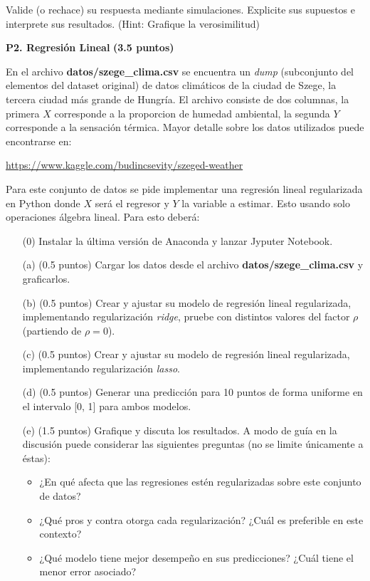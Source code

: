 \documentclass[11pt,letterpaper]{article}
\begin{document}
Valide (o rechace) su respuesta mediante simulaciones. Explicite sus supuestos e interprete sus resultados. (Hint: Grafique la verosimilitud)


\vspace{5 mm}
\noindent\textbf{P2. Regresión Lineal} \textbf{(3.5 puntos)}
\vspace{5 mm}

En el archivo \textbf{datos/szege\_clima.csv} se encuentra un \emph{dump} (subconjunto del  elementos del dataset original) de datos climáticos de la ciudad de Szege, la tercera ciudad más grande de Hungría. El archivo consiste de dos columnas, la primera $X$ corresponde a la proporcion de humedad ambiental, la segunda $Y$ corresponde a la sensación térmica. Mayor detalle sobre los datos utilizados puede encontrarse en:

\vspace{1em}
\centerline{\url{https://www.kaggle.com/budincsevity/szeged-weather}}
\vspace{1em}

Para este conjunto de datos se pide implementar una regresión lineal regularizada en Python donde $X$ será el regresor y $Y$ la variable a estimar. Esto usando solo operaciones álgebra lineal.
Para esto deberá:
\begin{itemize}
	\item[(0)] Instalar la última versión de Anaconda y lanzar Jyputer Notebook.
	\item[(a)] (0.5 puntos) Cargar los datos desde el archivo \textbf{datos/szege\_clima.csv} y graficarlos.
	\item[(b)] (0.5 puntos) Crear y ajustar su modelo de regresión lineal regularizada, implementando regularización \emph{ridge}, pruebe con distintos valores del factor $\rho$ (partiendo de $\rho=0$).
	\item[(c)] (0.5 puntos) Crear y ajustar su modelo de regresión lineal regularizada, implementando regularización \emph{lasso}.
	\item[(d)] (0.5 puntos) Generar una predicción para 10 puntos de forma uniforme en el intervalo [0, 1] para ambos modelos.
	\item[(e)] (1.5 puntos) Grafique y discuta los resultados. A modo de guía en la discusión puede considerar las siguientes preguntas (no se limite únicamente a éstas):
	    \begin{itemize}
	        \item ¿En qué afecta que las regresiones estén regularizadas sobre este conjunto de datos?
	        \item ¿Qué pros y contra otorga cada regularización? ¿Cuál es preferible en este contexto?
	        \item ¿Qué modelo tiene mejor desempeño en sus predicciones? ¿Cuál tiene el menor error asociado?
	    \end{itemize}
\end{itemize}
\end{document}
